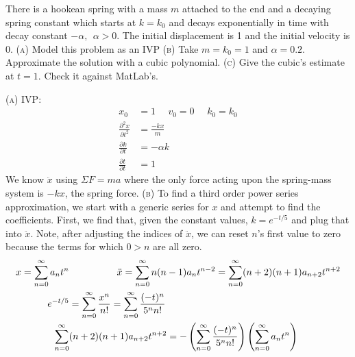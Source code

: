 \documentclass{article}
\begin{document}
\pagebreak
{} There is a hookean spring with a mass $m$ attached to the end and a decaying spring constant which starts at $k = k_0$ and decays exponentially in time with decay constant $-\alpha, \:\: \alpha > 0$.  The initial displacement is 1 and the initial velocity is 0.
\newline\textsc{(a)} Model this problem as an IVP
\newline\textsc{(b)} Take $m = k_0 = 1$ and $\alpha = 0.2$.  Approximate the solution with a cubic polynomial.
\newline\textsc{(c)} Give the cubic's estimate at $t=1$.  Check it against MatLab's.

\hangindent=20pt
\vspace{10pt}
\newline \textsc{(a)} IVP:
\begin{align*}
    x_0 &= 1 \:\:\:\:\:\: v_0 = 0 \:\:\:\:\:\: k_0 = k_0 \\
    \frac{\partial^2{x}}{\partial{t}^2} &= \frac{-kx}{m} \\
    \frac{\partial{k}}{\partial{t}} &= -\alpha k \\
    \frac{\partial{t}}{\partial{t}} &= 1
\end{align*}
We know $\ddot{x}$ using $\Sigma F = ma$ where the only force acting upon the spring-mass system is $-kx$, the spring force.
\newline\newline\textsc{(b)} To find a third order power series approximation, we start with a generic series for $x$ and attempt to find the coefficients.  First, we find that, given the constant values, $k = e^{-t/5}$ and plug that into $\ddot{x}$.  Note, after adjusting the indices of $\ddot{x}$, we can reset $n$'s first value to zero because the terms for which $0 > n$ are all zero.
\begin{align*}
    x = \sum_{n = 0}^\infty a_nt^n & \hbox{\hspace{5em}}\ddot{x} = \sum_{n = 0}^\infty n(n-1)a_nt^{n-2} = \sum_{n=0}^\infty (n+2)(n+1)a_{n+2}t^{n+2} \\
    e^{-t/5} &= \sum_{n=0}^\infty \frac{x^n}{n!} = \sum_{n=0}^\infty \frac{(-t)^n}{5^n n!} \\
    \sum_{n=0}^\infty & (n+2)(n+1)a_{n+2}t^{n+2} = -\left(\sum_{n=0}^\infty \frac{(-t)^n}{5^n n!} \right)\left( \sum_{n = 0}^\infty a_nt^n\right)
\end{align*}
\end{document}
